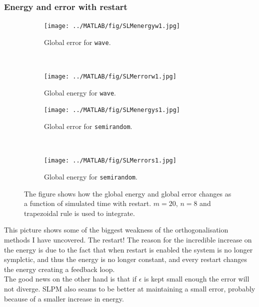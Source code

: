 \subsubsection{Energy and error with restart} %
\begin{figure}[H]
        \centering
        \begin{subfigure}[b]{0.45\textwidth}
                \texttt{[image: ../MATLAB/fig/SLMenergyw1.jpg]}
                \caption{Global error for \texttt{wave}.}
                \label{fig:SLMenergyw1}
        \end{subfigure}
        ~
        \begin{subfigure}[b]{0.45\textwidth}
                \texttt{[image: ../MATLAB/fig/SLMerrorw1.jpg]}
                \caption{Global energy for \texttt{wave}.}
                \label{fig:SLMerrorw1}
        \end{subfigure}
        
        \begin{subfigure}[b]{0.45\textwidth}
                \texttt{[image: ../MATLAB/fig/SLMenergys1.jpg]}
                \caption{Global error for \texttt{semirandom}.}
                \label{fig:SLMenergys1}
        \end{subfigure}
		~
        \begin{subfigure}[b]{0.45\textwidth}
                \texttt{[image: ../MATLAB/fig/SLMerrors1.jpg]}
                \caption{Global energy for \texttt{semirandom}.}
                \label{fig:SLMerrors1}
        \end{subfigure}
        \caption{ The figure shows how the global energy and global error changes as a function of simulated time with restart. $m = 20$, $n = 8$ and trapezoidal rule is used to integrate.}
        \label{fig:SLMenergyerror1}
\end{figure}
This picture shows some of the biggest weakness of the orthogonalisation methods I have  uncovered. The restart! The reason for the incredible increase on the energy is due to the fact that when restart is enabled the system is no longer symplctic, and thus the energy is no longer constant, and every restart changes the energy creating a feedback loop. \\ 

The good news on the other hand is that if $\epsilon$ is kept small enough the error will not diverge. SLPM also seams to be better at maintaining a small error, probably because of a smaller increase in energy. 

